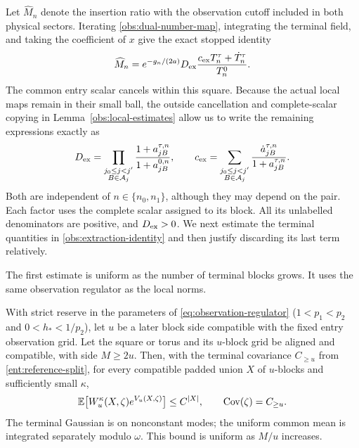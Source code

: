 Let \(\widehat M_n\) denote the insertion ratio with the observation
cutoff included in both physical sectors.  Iterating
\eqref{obs:dual-number-map}, integrating the terminal field, and
taking the coefficient of \(x\) give the exact stopped identity
\begin{equation}\label{obs:extraction-identity}
 \widehat M_n=e^{-g_n/(2a)}D_{\rm ex}
              \frac{c_{\rm ex}T_n^\tau+\dot T_n^\tau}{T_n^0}.
\end{equation}
The common entry scalar cancels within this square.  Because the
actual local maps remain in their small ball, the outside cancellation
and complete-scalar copying in Lemma~\ref{obs:local-estimates} allow
us to write the remaining expressions exactly as
\begin{equation}\label{obs:extracted-scalars}
 D_{\rm ex}=
 \prod_{\substack{j_0\le j<j'\\B\in\mathcal A_j}}
          \frac{1+a_{jB}^{\tau,n}}{1+a_{jB}^{0,n}},
 \qquad
 c_{\rm ex}=
 \sum_{\substack{j_0\le j<j'\\B\in\mathcal A_j}}
          \frac{\dot a_{jB}^{\tau,n}}{1+a_{jB}^{\tau,n}}.
\end{equation}
Both are independent of \(n\in\{n_0,n_1\}\), although they may
depend on the pair.  Each factor uses the complete scalar assigned
to its block.  All its unlabelled denominators are positive, and
\(D_{\rm ex}>0\).  We next estimate the terminal quantities in
\eqref{obs:extraction-identity} and then justify discarding its last
term relatively.

The first estimate is uniform as the number of terminal blocks grows.
It uses the same observation regulator as the local norms.

\begin{lemma}\label{ent:terminal-regulator}
With strict reserve in the parameters of
\eqref{eq:observation-regulator} (\(1<p_1<p_2\) and
\(0<h_*<1/p_2\)), let \(u\) be a later block side compatible with
the fixed entry observation grid.  Let the square or torus and its
\(u\)-block grid be aligned and compatible, with side \(M\ge2u\).
Then, with the terminal covariance \(C_{\ge u}\) from
\eqref{ent:reference-split}, for every compatible padded union \(X\)
of \(u\)-blocks and sufficiently small \(\kappa\),
\[
 \mathbb E\bigl[W_u^\kappa(X,\zeta)e^{V_u(X,\zeta)}\bigr]
 \le C^{|X|},\qquad \operatorname{Cov}(\zeta)=C_{\ge u}.
\]
The terminal Gaussian is on nonconstant modes; the uniform common
mean is integrated separately modulo \(\omega\).  This bound is uniform
as \(M/u\) increases.
\end{lemma}

